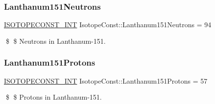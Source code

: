 \subsubsection{\texorpdfstring{Lanthanum151\+Neutrons}{Lanthanum151Neutrons}}
{\footnotesize\ttfamily \mbox{\hyperlink{group___isotope_const-_macros_ga5f18360b3e99483a35c32d789e62621c}{I\+S\+O\+T\+O\+P\+E\+C\+O\+N\+S\+T\+\_\+\+I\+NT}} Isotope\+Const\+::\+Lanthanum151\+Neutrons = 94}

\$ \$ Neutrons in Lanthanum-\/151. \mbox{\label{group___isotope_const-_lanthanum-_la151_ga40e58505278a04e48347c5656e330904}} 
\subsubsection{\texorpdfstring{Lanthanum151\+Protons}{Lanthanum151Protons}}
{\footnotesize\ttfamily \mbox{\hyperlink{group___isotope_const-_macros_ga5f18360b3e99483a35c32d789e62621c}{I\+S\+O\+T\+O\+P\+E\+C\+O\+N\+S\+T\+\_\+\+I\+NT}} Isotope\+Const\+::\+Lanthanum151\+Protons = 57}

\$ \$ Protons in Lanthanum-\/151. 